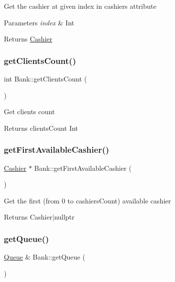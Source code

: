 Get the cashier at given index in cashiers attribute 
\begin{DoxyParams}{Parameters}
{\em index} & Int \\
\hline
\end{DoxyParams}
\begin{DoxyReturn}{Returns}
\hyperlink{classCashier}{Cashier} 
\end{DoxyReturn}
\mbox{\label{classBank_a46e579a690e0d3ca175923fcbae30a2d}} 
\subsubsection{\texorpdfstring{get\+Clients\+Count()}{getClientsCount()}}
{\footnotesize\ttfamily int Bank\+::get\+Clients\+Count (\begin{DoxyParamCaption}{ }\end{DoxyParamCaption})}

Get clients count \begin{DoxyReturn}{Returns}
clients\+Count Int 
\end{DoxyReturn}
\mbox{\label{classBank_a406e1fc9b050ed4559760c5a52fe81e4}} 
\subsubsection{\texorpdfstring{get\+First\+Available\+Cashier()}{getFirstAvailableCashier()}}
{\footnotesize\ttfamily \hyperlink{classCashier}{Cashier} $\ast$ Bank\+::get\+First\+Available\+Cashier (\begin{DoxyParamCaption}{ }\end{DoxyParamCaption})}

Get the first (from 0 to cashiers\+Count) available cashier \begin{DoxyReturn}{Returns}
Cashier$\vert$nullptr 
\end{DoxyReturn}
\mbox{\label{classBank_a79644f520ee9fafdfa1ffa303b84bb4a}} 
\subsubsection{\texorpdfstring{get\+Queue()}{getQueue()}}
{\footnotesize\ttfamily \hyperlink{classQueue}{Queue} \& Bank\+::get\+Queue (\begin{DoxyParamCaption}{ }\end{DoxyParamCaption})}

